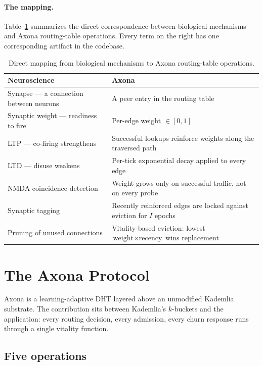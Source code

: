 \documentclass[conference]{IEEEtran}
\newcommand{\axona}{Axona\xspace}
\begin{document}
\paragraph{The mapping.}
Table~\ref{tab:mapping} summarizes the direct correspondence
between biological mechanisms and \axona routing-table
operations.  Every term on the right has one corresponding
artifact in the codebase.

\begin{table}[t]
\centering
\caption{Direct mapping from biological mechanisms to \axona
routing-table operations.}
\label{tab:mapping}
\small
\begin{tabular}{@{}p{}p{}@{}}
\toprule
\textbf{Neuroscience} & \textbf{\axona} \\
\midrule
Synapse --- a connection between neurons & A peer entry in the
routing table \\
Synaptic weight --- readiness to fire & Per-edge weight $\in [0,1]$ \\
LTP --- co-firing strengthens & Successful lookups reinforce
weights along the traversed path \\
LTD --- disuse weakens & Per-tick exponential decay applied to
every edge \\
NMDA coincidence detection & Weight grows only on successful
traffic, not on every probe \\
Synaptic tagging~\cite{frey1997synaptic} & Recently reinforced
edges are locked against eviction for $I$ epochs \\
Pruning of unused connections & Vitality-based eviction: lowest
$\text{weight} \times \text{recency}$ wins replacement \\
\bottomrule
\end{tabular}
\end{table}

\section{The \axona Protocol}
\label{sec:axona}

\axona is a learning-adaptive DHT layered above an unmodified
Kademlia substrate.  The contribution sits between Kademlia's
$k$-buckets and the application: every routing decision, every
admission, every churn response runs through a single vitality
function.

\subsection{Five operations}
\label{sec:axona-overview}
\end{document}
